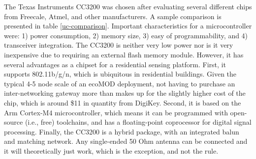 \begin{table}[h]
\caption{Microcontroller comparison}
\label{uc-comparison}
\end{table}

The Texas Instruments CC3200 was chosen after evaluating several different chips from Freecale, Atmel, and other manufacturers. A sample comparison is presented in table \ref{uc-comparison}. Important characteristics for a microcontroller were: 1) power consumption, 2) memory size, 3) easy of programmability, and 4) transceiver integration. The CC3200 is neither very low power nor is it very inexpensive due to requiring an external flash memory module. However, it has several advantages as a chipset for a residential sensing platform. First, it supports 802.11b/g/n, which is ubiquitous in residential buildings. Given the typical 4-5 node scale of an ecoMOD deployment, not having to purchase an inter-networking gateway more than makes up for the slightly higher cost of the chip, which is around \$11 in quantity from DigiKey. Second, it is based on the Arm Cortex-M4 microcontroller, which means it can be programmed with open-source (i.e., free) toolchains, and has a floating-point coprocessor for digital signal processing. Finally, the CC3200 is a hybrid package, with an integrated balun and matching network. Any single-ended 50 Ohm antenna can be connected and it will theoretically just work, which is the exception, and not the rule.

